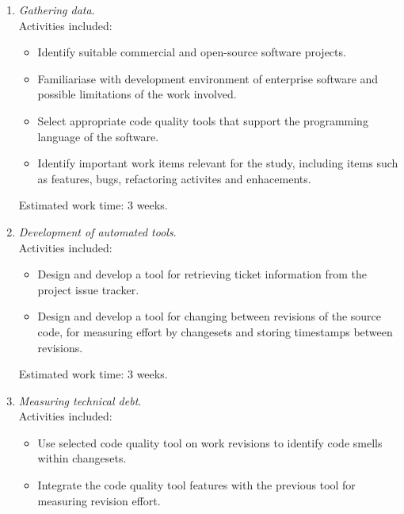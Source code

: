 \documentclass{mprop}
\begin{document}
\begin{enumerate}
	\item \textit{Gathering data}.\\
	      Activities included:
	      \begin{itemize}
		      \item Identify suitable commercial and open-source software projects.
		      \item Familiariase with development environment of enterprise software
		            and possible limitations of the work involved.
		      \item Select appropriate code quality tools that support the programming
		            language of the software.
		      \item Identify important work items relevant for the study, including
		            items such as features, bugs, refactoring activites and enhacements.
	      \end{itemize}

	      Estimated work time: 3 weeks.\\

	\item \textit{Development of automated tools}.\\
	      Activities included:
	      \begin{itemize}
		      \item Design and develop a tool for retrieving ticket information from
		            the project issue tracker.
		      \item Design and develop a tool for changing between revisions of the
		            source code, for measuring effort by changesets and storing timestamps
		            between revisions.
	      \end{itemize}

	      Estimated work time: 3 weeks.\\

	\item \textit{Measuring technical debt}.\\
	      Activities included:
	      \begin{itemize}
		      \item Use selected code quality tool on work revisions to identify code
		            smells within changesets.
		      \item Integrate the code quality tool features with the previous tool
		            for measuring revision effort.
	      \end{itemize}


\end{enumerate}
\end{document}

